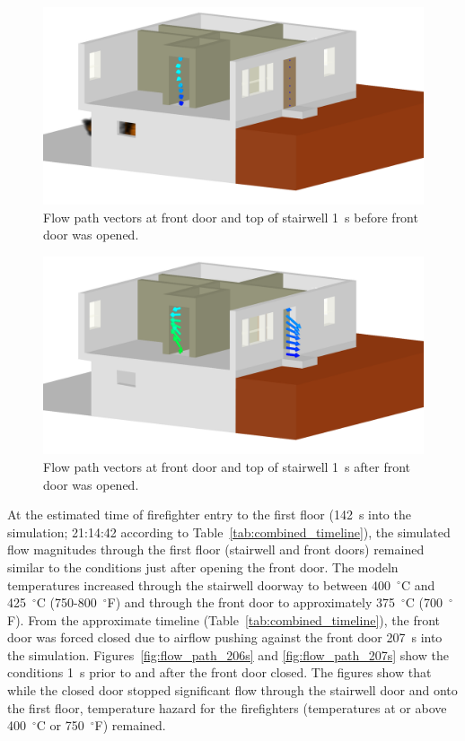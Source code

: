 \documentclass[12pt,oneside]{book}
\begin{document}
\begin{figure}[!ht]
\includegraphics[trim = 2.5in 0in 4in 0in, clip=true, width=.65\textwidth]{../Figures/flow_vector_99s}


\caption[Flow path vectors at front door and top of stairwell 1~s before front door was opened]
{Flow path vectors at front door and top of stairwell 1~s before front door was opened.}
\label{fig:flow_path_99s}
\end{figure}

\begin{figure}[!ht]
\includegraphics[trim = 2.5in 0in 4in 0in, clip=true, width=.65\textwidth]{../Figures/flow_vector_101s}


\caption[Flow path vectors at front door and top of stairwell 1~s after front door was opened]
{Flow path vectors at front door and top of stairwell 1~s after front door was opened.}
\label{fig:flow_path_101s} 
\end{figure}

\clearpage

At the estimated time of firefighter entry to the first floor (142~s into the simulation; 21:14:42 according to Table~\ref{tab:combined_timeline}), the simulated flow magnitudes through the first floor (stairwell and front doors) remained similar to the conditions just after opening the front door. The modeln temperatures increased through the stairwell doorway to between 400~$^{\circ}$C and 425~$^{\circ}$C (750-800~$^{\circ}$F) and through the front door to approximately 375~$^{\circ}$C (700~$^{\circ}$F). From the approximate timeline (Table~\ref{tab:combined_timeline}), the front door was forced closed due to airflow pushing against the front door 207~s into the simulation. Figures~\ref{fig:flow_path_206s} and \ref{fig:flow_path_207s} show the conditions 1~s prior to and after the front door closed. The figures show that while the closed door stopped significant flow through the stairwell door and onto the first floor, temperature hazard for the firefighters (temperatures at or above 400~$^{\circ}$C or 750~$^{\circ}$F) remained.
\end{document}
